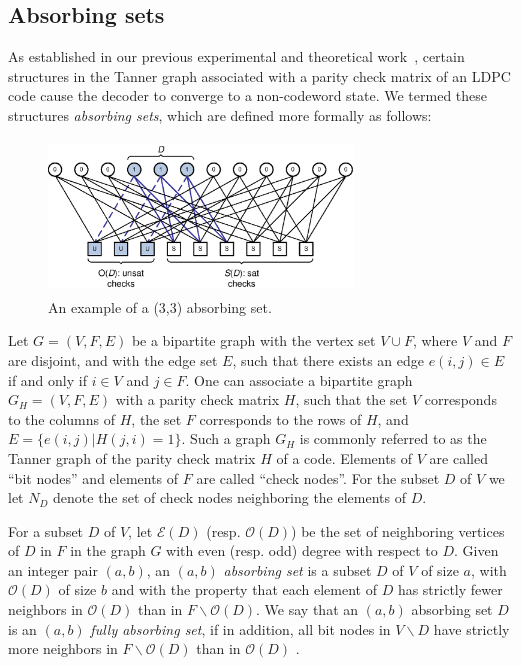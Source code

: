 \subsection{Absorbing sets}
As established in our previous experimental and theoretical
work~\cite{zhang06,icc-theory}, certain structures in the Tanner graph
associated with a parity check matrix of an LDPC code cause the
decoder to converge to a non-codeword state. We termed these
structures \emph{absorbing sets}, which are defined more formally as
follows:

\begin{figure}
%
\center
\includegraphics[width=3.2in,height=1.6in]{ITW07_33.eps}
%
\caption{An example of a (3,3) absorbing set.} \label{abs44}
\end{figure}

\vspace{0.0in}Let $G=(V,F,E)$ be a bipartite graph with the vertex
set $V \cup F$, where $V$ and $F$ are disjoint, and with the edge
set $E$, such that there exists an edge $e(i,j) \in E$ if and only
if $i\in V$ and $j\in F$.  One can associate a bipartite graph
$G_H=(V,F,E)$ with a parity check matrix $H$, such that the set $V$
corresponds to the columns of $H$, the set $F$ corresponds to the
rows of $H$, and $E=\{ e(i,j)| H(j,i)=1\}$. Such a graph $G_H$ is
commonly referred to as the Tanner graph of the parity check matrix
$H$ of a code. Elements of $V$ are called ``bit nodes'' and elements
of $F$ are called ``check nodes''. For the subset $D$ of $V$ we let
$N_D$ denote the set of check nodes neighboring the elements of $D$.

For a subset $D$ of $V$, let $\mathcal{E}(D)$ (resp.
$\mathcal{O}(D)$) be the set of neighboring vertices of $D$ in $F$
in the graph $G$ with even (resp. odd) degree with respect to $D$.
Given an integer pair $(a,b)$, an $(a,b)$ \emph{absorbing set} is
a subset $D$ of $V$ of size $a$, with $\mathcal{O}(D)$ of size $b$
and with the property that each element of $D$ has strictly fewer
neighbors in $\mathcal{O}(D)$ than in $F\backslash
\mathcal{O}(D)$. We say that an $(a,b)$ absorbing set $D$ is an
$(a,b)$ \emph{fully absorbing set}, if in addition, all bit nodes
in $V\backslash D$ have strictly more neighbors in $F\backslash
\mathcal{O}(D)$ than in $\mathcal{O}(D)$ \cite{icc-theory}.


